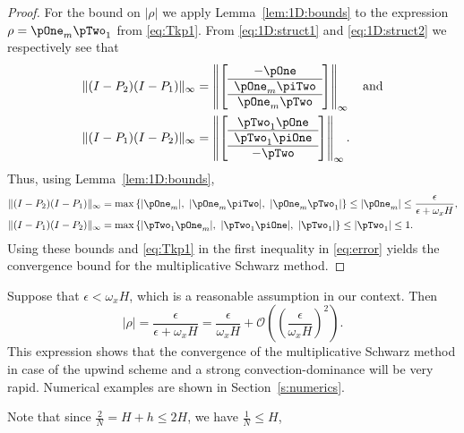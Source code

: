 \begin{proof}
For the bound on $|\rho|$ we apply Lemma~\ref{lem:1D:bounds} to the expression
$\rho=\pOne_m \pTwo_1$ from \eqref{eq:Tkp1}.
%
From \eqref{eq:1D:struct1} and \eqref{eq:1D:struct2} we respectively see that
%
\begin{align*}
\|(I-P_2)(I-P_1)\|_\infty &= \left\|\left[\begin{array}{c}
-\pOne\\
\hline
\pOne_m\piTwo\\
\hline
\pOne_m \pTwo
\end{array}\right]\right\|_\infty
\quad\mbox{and} \\
\|(I-P_1)(I-P_2)\|_\infty &= \left\|\left[\begin{array}{c}
\pTwo_1 \pOne\\
\hline
\pTwo_1\piOne\\
\hline
-\pTwo\end{array}\right]\right\|_\infty.
\end{align*}
%
Thus, using Lemma~\ref{lem:1D:bounds},
%
\begin{align*}
\| (I-P_2)(I-P_1) \|_\infty &= \max\left\{|\pOne_m|, \ |\pOne_m \piTwo|,\ |\pOne_m \pTwo_1|\right\} \leq |\pOne_m|\leq \frac{\epsilon}{\epsilon+\omega_x H},\\
\| (I-P_1)(I-P_2) \|_\infty &= \max\left\{|\pTwo_1 \pOne_m|, \ |\pTwo_1 \piOne|,\ | \pTwo_1|\right\}
\leq | \pTwo_1|\leq 1.
\end{align*}
%
Using these bounds and \eqref{eq:Tkp1} in the first inequality in
\eqref{eq:error} yields the convergence bound for the multiplicative Schwarz
method.
\end{proof}

Suppose that $\epsilon < \omega_x H$, which is a reasonable assumption in our
context. Then
%
$$|\rho|=\frac{\epsilon}{\epsilon+\omega_x H} = \frac{\epsilon}{\omega_x H}
+ \mathscr{O}\left(\left(\frac{\epsilon}{\omega_x H}\right)^2\right).$$
%
This expression shows that the convergence of the multiplicative Schwarz
method in case of the upwind scheme and a strong convection-dominance will be
very rapid. Numerical examples are shown in Section~\ref{s:numerics}.

Note that since $\frac{2}{N} = H+h \leq 2H$, we have $\frac{1}{N} \leq H$,

